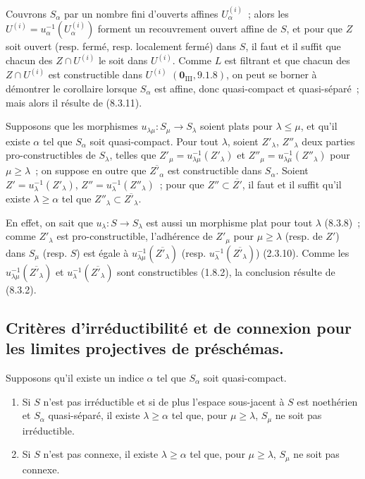 Couvrons $S_\alpha$ par un nombre fini d'ouverts affines
$U_\alpha^{(i)}$~; alors les $U^{(i)}=u_\alpha^{-1}(U_\alpha^{(i)})$ forment
un recouvrement ouvert affine de $S$, et pour que $Z$ soit ouvert (resp.
fermé, resp. localement fermé) dans $S$, il faut et il suffit que chacun des
$Z\cap U^{(i)}$ le soit dans $U^{(i)}$. Comme $L$ est filtrant et que chacun
des $Z\cap U^{(i)}$ est constructible dans $U^{(i)}$
$(\mathbf{0}_{\mathrm{III}},9.1.8)$, on peut se borner à démontrer le corollaire
lorsque $S_\alpha$ est affine, donc quasi-compact et quasi-séparé~; mais alors
il résulte de (8.3.11).

\begin{proposition}[8.3.13]
\label{IV.8.3.13-fr}
Supposons que les morphismes $u_{\lambda\mu}:S_\mu\to S_\lambda$ soient
plats pour $\lambda\leq\mu$, et qu'il existe $\alpha$ tel que $S_\alpha$ soit
quasi-compact. Pour tout $\lambda$, soient $Z'_\lambda$, $Z''_\lambda$ deux
parties pro-constructibles de $S_\lambda$, telles que
$Z'_\mu=u_{\lambda\mu}^{-1}(Z'_\lambda)$ et
$Z''_\mu=u_{\lambda\mu}^{-1}(Z''_\lambda)$ pour $\mu\geq\lambda$~; on
suppose en outre que $\overline{Z'_\alpha}$ est constructible dans
$S_\alpha$. Soient $Z'=u_\lambda^{-1}(Z'_\lambda)$,
$Z''=u_\lambda^{-1}(Z''_\lambda)$~; pour que
$Z''\subset\overline{Z'}$, il faut et il suffit qu'il existe
$\lambda\geq\alpha$ tel que
$Z''_\lambda\subset\overline{Z'_\lambda}$.
\end{proposition}

En effet, on sait que $u_\lambda:S\to S_\lambda$ est aussi un morphisme plat
pour tout $\lambda$ (8.3.8)~; comme $Z'_\lambda$ est pro-constructible,
l'adhérence de $Z'_\mu$ pour $\mu\geq\lambda$ (resp. de $Z'$) dans $S_\mu$
(resp. $S$) est égale à
$u_{\lambda\mu}^{-1}(\overline{Z'_\lambda})$ (resp.
$u_\lambda^{-1}(\overline{Z'_\lambda})$) (2.3.10). Comme les
$u_{\lambda\mu}^{-1}(\overline{Z'_\lambda})$ et
$u_\lambda^{-1}(\overline{Z'_\lambda})$ sont constructibles (1.8.2), la
conclusion résulte de (8.3.2).

\subsection{Critères d'irréductibilité et de connexion pour les limites
projectives de préschémas.}
\label{subsection:IV.8.4-fr}

\begin{proposition}[8.4.1]
\label{IV.8.4.1-fr}
Supposons qu'il existe un indice $\alpha$ tel que $S_\alpha$ soit
quasi-compact.
\begin{enumerate}
\item[\textup{(i)}] Si $S$ n'est pas irréductible et si de plus l'espace sous-jacent à
$S$ est noethérien et $S_\alpha$ quasi-séparé, il existe
$\lambda\geq\alpha$ tel que, pour $\mu\geq\lambda$, $S_\mu$ ne soit pas
irréductible.
\item[\textup{(ii)}] Si $S$ n'est pas connexe, il existe $\lambda\geq\alpha$ tel que,
pour $\mu\geq\lambda$, $S_\mu$ ne soit pas connexe.
\end{enumerate}
\end{proposition}

